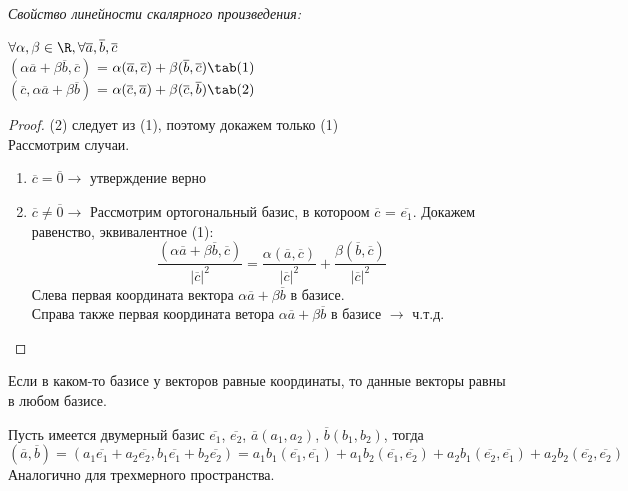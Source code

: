 \begin{theorem}
    \textit{Свойство линейности скалярного произведения:}
    \begin{center}
        $\forall\alpha,\beta\in\R, \forall\overline{a}, \overline{b}, \overline{c}$\\
        $(\alpha\overline{a} + \beta\overline{b}, \overline{c})$ = $\alpha(\overline{a}, \overline{c}) + \beta(\overline{b}, \overline{c})\tab(1)$\\
        $(\overline{c}, \alpha\overline{a} + \beta\overline{b})$ = $\alpha(\overline{c}, \overline{a}) + \beta(\overline{c}, \overline{b})\tab(2)$
    \end{center}
\end{theorem}
\begin{proof}
    (2) следует из (1), поэтому докажем только (1)\\

    Рассмотрим случаи.
    
    \begin{enumerate}
        \item $\overline{c} = \overline{0} \longrightarrow$ утверждение верно
        \item $\overline{c} \neq \overline{0} \longrightarrow$ Рассмотрим ортогональный базис, в котороом $\overline{c}$ = $\overline{e_1}$. Докажем равенство, эквивалентное (1):
        \[
        \dfrac{(\alpha\overline{a} + \beta\overline{b}, \overline{c})}{|\overline{c}|^2} = \dfrac{\alpha(\overline{a}, \overline{c})}{|\overline{c}|^2} + \dfrac{\beta(\overline{b}, \overline{c})}{|\overline{c}|^2}
        \]
        Слева первая координата вектора $\alpha\overline{a} + \beta\overline{b}$ в базисе.\\
        Справа также первая координата ветора $\alpha\overline{a} + \beta\overline{b}$ в базисе $\longrightarrow$ ч.т.д.
    \end{enumerate}
\end{proof}

\begin{corollary}
    Если в каком-то базисе у векторов равные координаты, то данные векторы равны в любом базисе.
\end{corollary}

Пусть имеется двумерный базис $\overline{e_1}$, $\overline{e_2}$, $\overline{a}(a_1, a_2)$, $\overline{b}(b_1, b_2)$, тогда
\[
(\overline{a}, \overline{b}) = (a_1\overline{e_1} + a_2\overline{e_2}, b_1\overline{e_1} + b_2\overline{e_2}) = a_1 b_1(\overline{e_1}, \overline{e_1}) + a_1 b_2(\overline{e_1}, \overline{e_2}) + a_2 b_1(\overline{e_2}, \overline{e_1}) + a_2 b_2(\overline{e_2}, \overline{e_2})
\]
Аналогично для трехмерного пространства.\\

